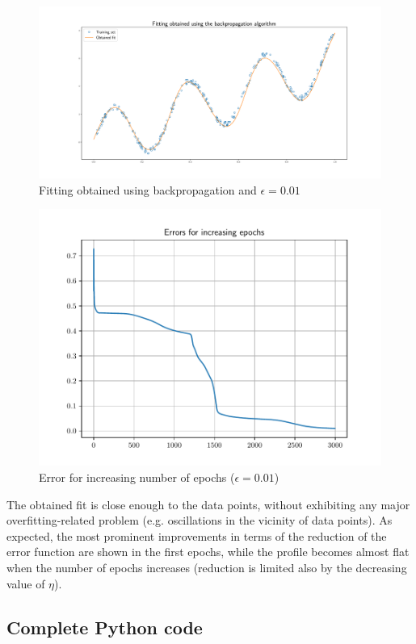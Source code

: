 \documentclass[letterpaper,headings=standardclasses]{scrartcl}
\begin{document}
\begin{figure}[h]
\centering
\includegraphics[width=\linewidth]{fit_9.pdf}
\caption{Fitting obtained using backpropagation and $\epsilon = 0.01$}
\label{fit_9}
\end{figure}

\begin{figure}[h]
\centering
\includegraphics[width=.7\linewidth]{err_9.pdf}
\caption{Error for increasing number of epochs ($\epsilon = 0.01$)}
\label{err_9}
\end{figure}

The obtained fit is close enough to the data points, without exhibiting any major overfitting-related problem (e.g. oscillations in the vicinity of data points). As expected, the most prominent improvements in terms of the reduction of the error function are shown in the first epochs, while the profile becomes almost flat when the number of epochs increases (reduction is limited also by the decreasing value of $\eta$).

\subsection{Complete Python code}


\end{document}
